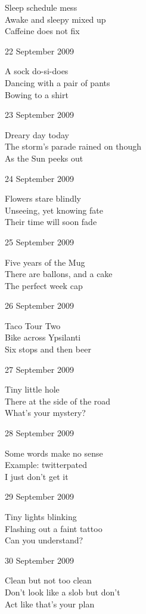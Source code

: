 \documentclass[12pt]{article}
\begin{document}
Sleep schedule mess \\
Awake and sleepy mixed up \\
Caffeine does not fix

22 September 2009 

A sock do-si-does \\
Dancing with a pair of pants \\
Bowing to a shirt

23 September 2009

Dreary day today \\
The storm's parade rained on though \\
As the Sun peeks out


\newpage

24 September 2009

Flowers stare blindly \\
Unseeing, yet knowing fate \\
Their time will soon fade

25 September 2009

Five years of the Mug \\
There are ballons, and a cake \\
The perfect week cap

26 September 2009

Taco Tour Two \\
Bike across Ypsilanti \\
Six stops and then beer

27 September 2009

Tiny little hole \\
There at the side of the road \\
What's your mystery?

28 September 2009

Some words make no sense \\
Example: twitterpated \\
I just don't get it

29 September 2009

Tiny lights blinking \\
Flashing out a faint tattoo \\
Can you understand?

30 September 2009

Clean but not too clean \\
Don't look like a slob but don't \\
Act like that's your plan

\newpage
\end{document}
